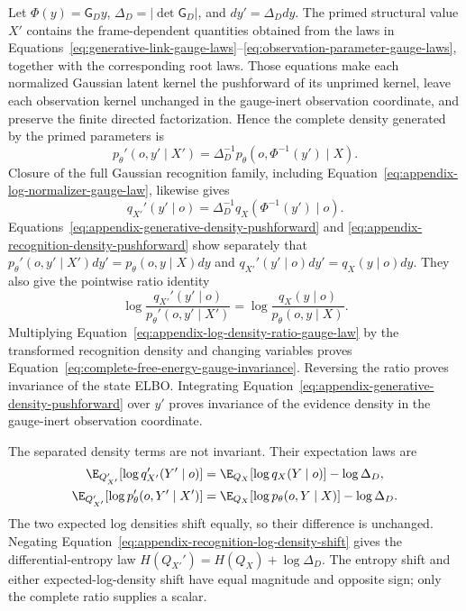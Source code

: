 Let \(\Phi(y)=\mathsf G_Dy\), \(\Delta_D=|\det\mathsf G_D|\), and \(dy'=\Delta_Ddy\). The primed structural value \(X'\) contains the frame-dependent quantities obtained from the laws in Equations~\eqref{eq:generative-link-gauge-laws}--\eqref{eq:observation-parameter-gauge-laws}, together with the corresponding root laws. Those equations make each normalized Gaussian latent kernel the pushforward of its unprimed kernel, leave each observation kernel unchanged in the gauge-inert observation coordinate, and preserve the finite directed factorization. Hence the complete density generated by the primed parameters is
\begin{equation}
p_\theta'(o,y'\mid X')
=\Delta_D^{-1}
p_\theta(o,\Phi^{-1}(y')\mid X).
\label{eq:appendix-generative-density-pushforward}
\end{equation}
Closure of the full Gaussian recognition family, including Equation~\eqref{eq:appendix-log-normalizer-gauge-law}, likewise gives
\begin{equation}
q_{X'}'(y'\mid o)
=\Delta_D^{-1}
q_X(\Phi^{-1}(y')\mid o).
\label{eq:appendix-recognition-density-pushforward}
\end{equation}
Equations~\eqref{eq:appendix-generative-density-pushforward} and \eqref{eq:appendix-recognition-density-pushforward} show separately that \(p_\theta'(o,y'\mid X')dy'=p_\theta(o,y\mid X)dy\) and \(q_{X'}'(y'\mid o)dy'=q_X(y\mid o)dy\). They also give the pointwise ratio identity
\begin{equation}
\log\frac{q_{X'}'(y'\mid o)}
{p_\theta'(o,y'\mid X')}
=\log\frac{q_X(y\mid o)}
{p_\theta(o,y\mid X)}.
\label{eq:appendix-log-density-ratio-gauge-law}
\end{equation}
Multiplying Equation~\eqref{eq:appendix-log-density-ratio-gauge-law} by the transformed recognition density and changing variables proves Equation~\eqref{eq:complete-free-energy-gauge-invariance}. Reversing the ratio proves invariance of the state ELBO. Integrating Equation~\eqref{eq:appendix-generative-density-pushforward} over \(y'\) proves invariance of the evidence density in the gauge-inert observation coordinate.

The separated density terms are not invariant. Their expectation laws are
\begin{align}
\E_{Q_{X'}'}[\log q_{X'}'(Y'\mid o)]
&=\E_{Q_X}[\log q_X(Y\mid o)]-\log\Delta_D,
\label{eq:appendix-recognition-log-density-shift}\\
\E_{Q_{X'}'}[\log p_\theta'(o,Y'\mid X')]
&=\E_{Q_X}[\log p_\theta(o,Y\mid X)]-\log\Delta_D.
\label{eq:appendix-joint-log-density-shift}
\end{align}
The two expected log densities shift equally, so their difference is unchanged. Negating Equation~\eqref{eq:appendix-recognition-log-density-shift} gives the differential-entropy law \(H(Q_{X'}')=H(Q_X)+\log\Delta_D\). The entropy shift and either expected-log-density shift have equal magnitude and opposite sign; only the complete ratio supplies a scalar.


